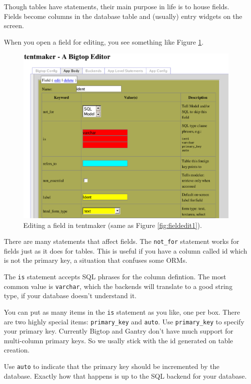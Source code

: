 Though tables have statements, their main purpose in life is to house
fields.  Fields become columns in the database table and (usually) entry
widgets on the screen.

When you open a field for editing, you see something like Figure
\ref{fig:fieldedit}.

\begin{figure}
\includegraphics[width=6in]{fieldedit}
\caption{Editing a field in tentmaker (same as Figure \ref{fig:fieldedit1}).}
\label{fig:fieldedit}
\end{figure}

There are many statements that affect fields.  The \verb+not_for+ statement
works for fields just as it does for tables.  This is useful if you have
a column called id which is not the primary key, a situation that confuses
some ORMs.

The \verb+is+ statement accepts SQL phrases for the column defintion.
The most common value is \verb+varchar+, which the backends will translate
to a good string type, if your database doesn't understand it.

You can put as many items in the \verb+is+ statement as you like, one per
box.  There are two highly special items: \verb+primary_key+ and \verb+auto+.
Use \verb+primary_key+ to specify your primary key.  Currently Bigtop and
Gantry don't have much support for multi-column primary keys.  So we
usally stick with the id generated on table creation.

Use \verb+auto+ to indicate that the primary key should be incremented
by the database.  Exactly how that happens is up to the SQL backend
for your database.


